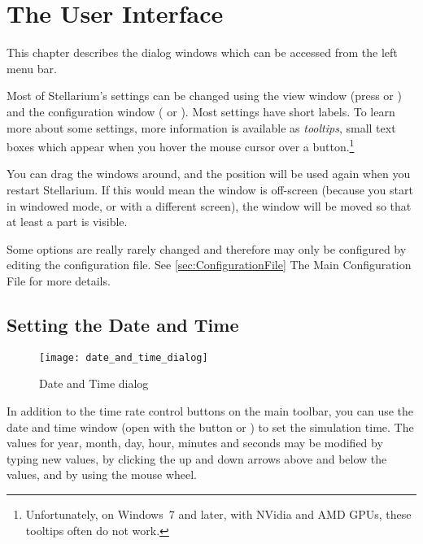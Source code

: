 

\chapter{The User Interface}
\label{ch:gui}


This chapter describes the dialog windows which can be accessed from the left menu bar.

Most of Stellarium's settings can be changed using the view window
(press  or ) and the
configuration window ( or
). Most settings have short labels. To learn more about some
settings, more information is available as \emph{tooltips}, small text
boxes which appear when you hover the mouse cursor over a
button.\footnote{Unfortunately, on Windows~7 and later, with NVidia
  and AMD GPUs, these tooltips often do not work.}

 You can drag the
windows around, and the position will be used again when you restart
Stellarium. If this would mean the window is off-screen (because you
start in windowed mode, or with a different screen), the window will
be moved so that at least a part is visible.

Some options are really rarely changed and therefore may only be
configured by editing the configuration file.  See
\ref{sec:ConfigurationFile} The Main Configuration File for more
details.



\section{Setting the Date and Time}
\label{sec:gui:date}

\begin{figure}[h]
\centering\texttt{[image: date\_and\_time\_dialog]}
\caption{Date and Time dialog}
\label{fig:gui:date}
\end{figure}

In addition to the time rate control buttons on the main toolbar, you
can use the date and time window (open with the  button or ) to set the simulation time. The values
for year, month, day, hour, minutes and seconds may be modified by
typing new values, by clicking the up and down arrows above and below
the values, and by using the mouse wheel.

